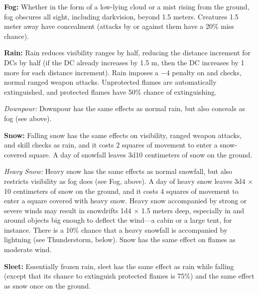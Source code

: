 \textbf{Fog:} Whether in the form of a low-lying cloud or a mist rising from the ground, fog obscures all sight, including darkvision, beyond 1.5 meters. Creatures 1.5 meter away have concealment (attacks by or against them have a 20\% miss chance).

\textbf{Rain:} Rain reduces visibility ranges by half, reducing the distance increment for  DCs by half (if the DC already increases by 1.5 m, then the DC increases by 1 more for each distance increment). Rain imposes a $-4$ penalty on  and  checks, normal ranged weapon attacks. Unprotected flames are automatically extinguished, and protected flames have 50\% chance of extinguishing.%

\textit{Downpour:} Downpour has the same effects as normal rain, but also conceals as fog (see above).

\textbf{Snow:} Falling snow has the same effects on visibility, ranged weapon attacks, and skill checks as rain, and it costs 2 squares of movement to enter a snow-covered square. A day of snowfall leaves 3d10 centimeters of snow on the ground.

\textit{Heavy Snow:} Heavy snow has the same effects as normal snowfall, but also restricts visibility as fog does (see Fog, above). A day of heavy snow leaves 3d4 $\times$ 10 centimeters of snow on the ground, and it costs 4 squares of movement to enter a square covered with heavy snow. Heavy snow accompanied by strong or severe winds may result in snowdrifts 1d4 $\times$ 1.5 meters deep, especially in and around objects big enough to deflect the wind---a cabin or a large tent, for instance. There is a 10\% chance that a heavy snowfall is accompanied by lightning (see Thunderstorm, below). Snow has the same effect on flames as moderate wind.

\textbf{Sleet:} Essentially frozen rain, sleet has the same effect as rain while falling (except that its chance to extinguish protected flames is 75\%) and the same effect as snow once on the ground.


